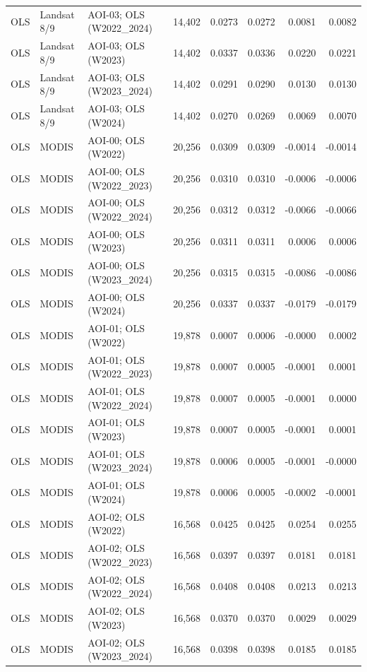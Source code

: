 \begin{landscape}
\begin{longtable}{lllrrrrr}
OLS & Landsat 8/9 & AOI-03; OLS (W2022\_2024) & 14,402 & 0.0273 & 0.0272 & 0.0081 & 0.0082 \\
OLS & Landsat 8/9 & AOI-03; OLS (W2023) & 14,402 & 0.0337 & 0.0336 & 0.0220 & 0.0221 \\
OLS & Landsat 8/9 & AOI-03; OLS (W2023\_2024) & 14,402 & 0.0291 & 0.0290 & 0.0130 & 0.0130 \\
OLS & Landsat 8/9 & AOI-03; OLS (W2024) & 14,402 & 0.0270 & 0.0269 & 0.0069 & 0.0070 \\
OLS & MODIS & AOI-00; OLS (W2022) & 20,256 & 0.0309 & 0.0309 & -0.0014 & -0.0014 \\
OLS & MODIS & AOI-00; OLS (W2022\_2023) & 20,256 & 0.0310 & 0.0310 & -0.0006 & -0.0006 \\
OLS & MODIS & AOI-00; OLS (W2022\_2024) & 20,256 & 0.0312 & 0.0312 & -0.0066 & -0.0066 \\
OLS & MODIS & AOI-00; OLS (W2023) & 20,256 & 0.0311 & 0.0311 & 0.0006 & 0.0006 \\
OLS & MODIS & AOI-00; OLS (W2023\_2024) & 20,256 & 0.0315 & 0.0315 & -0.0086 & -0.0086 \\
OLS & MODIS & AOI-00; OLS (W2024) & 20,256 & 0.0337 & 0.0337 & -0.0179 & -0.0179 \\
OLS & MODIS & AOI-01; OLS (W2022) & 19,878 & 0.0007 & 0.0006 & -0.0000 & 0.0002 \\
OLS & MODIS & AOI-01; OLS (W2022\_2023) & 19,878 & 0.0007 & 0.0005 & -0.0001 & 0.0001 \\
OLS & MODIS & AOI-01; OLS (W2022\_2024) & 19,878 & 0.0007 & 0.0005 & -0.0001 & 0.0000 \\
OLS & MODIS & AOI-01; OLS (W2023) & 19,878 & 0.0007 & 0.0005 & -0.0001 & 0.0001 \\
OLS & MODIS & AOI-01; OLS (W2023\_2024) & 19,878 & 0.0006 & 0.0005 & -0.0001 & -0.0000 \\
OLS & MODIS & AOI-01; OLS (W2024) & 19,878 & 0.0006 & 0.0005 & -0.0002 & -0.0001 \\
OLS & MODIS & AOI-02; OLS (W2022) & 16,568 & 0.0425 & 0.0425 & 0.0254 & 0.0255 \\
OLS & MODIS & AOI-02; OLS (W2022\_2023) & 16,568 & 0.0397 & 0.0397 & 0.0181 & 0.0181 \\
OLS & MODIS & AOI-02; OLS (W2022\_2024) & 16,568 & 0.0408 & 0.0408 & 0.0213 & 0.0213 \\
OLS & MODIS & AOI-02; OLS (W2023) & 16,568 & 0.0370 & 0.0370 & 0.0029 & 0.0029 \\
OLS & MODIS & AOI-02; OLS (W2023\_2024) & 16,568 & 0.0398 & 0.0398 & 0.0185 & 0.0185 \\

\end{longtable}
\end{landscape}
